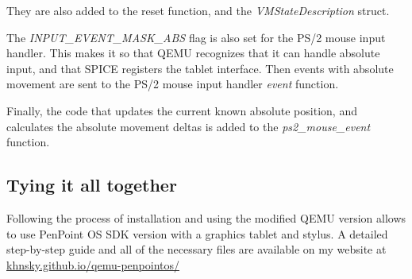 %

\begin{codeblock}
    
\end{codeblock}

They are also added to the reset function, and the \emph{VMStateDescription}
struct.

\begin{codeblock}
    
\end{codeblock}

The \emph{INPUT\_EVENT\_MASK\_ABS} flag is also set for the PS/2 mouse input
handler.  This makes it so that QEMU recognizes that it can handle absolute
input, and that SPICE registers the tablet interface.  Then events with absolute
movement are sent to the PS/2 mouse input handler \emph{event} function.

\begin{codeblock}
    
\end{codeblock}

Finally, the code that updates the current known absolute position, and
calculates the absolute movement deltas is added to the \emph{ps2\_mouse\_event}
function.

\begin{codeblock}
    
\end{codeblock}


\subsection{Tying it all together}


Following the process of installation and using the modified QEMU version allows
to use PenPoint OS SDK version with a graphics tablet and stylus.  A detailed
step-by-step guide and all of the necessary files are available on my website at
\url{khnsky.github.io/qemu-penpointos/}
